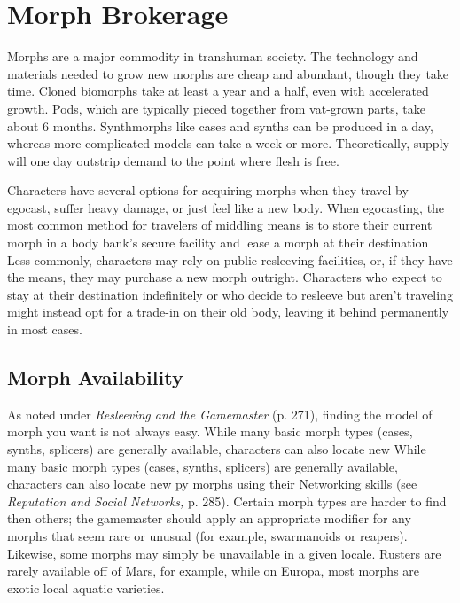 \section{Morph Brokerage}

Morphs are a major commodity in transhuman society. 
The technology and materials needed to grow new 
morphs are cheap and abundant, though they take 
time. Cloned biomorphs take at least a year and a half, 
even with accelerated growth. Pods, which are typically
pieced together from vat-grown parts, take about
6 months. Synthmorphs like cases and synths can be 
produced in a day, whereas more complicated models 
can take a week or more. Theoretically, supply will one 
day outstrip demand to the point where flesh is free.

Characters have several options for acquiring 
morphs when they travel by egocast, suffer heavy 
damage, or just feel like a new body. When egocasting, 
the most common method for travelers of middling 
means is to store their current morph in a body bank's 
secure facility and lease a morph at their destination
Less commonly, characters may rely on public
resleeving facilities, or, if they have the means, they 
may purchase a new morph outright. Characters who 
expect to stay at their destination indefinitely or who 
decide to resleeve but aren't traveling might instead 
opt for a trade-in on their old body, leaving it behind 
permanently in most cases.

\subsection{Morph Availability}

As noted under \textit{Resleeving and the Gamemaster} (p. 271), 
finding the model of morph you want is not always easy. 
While many basic morph types (cases, synths, splicers) 
are generally available, characters can also locate new 
While many basic morph types (cases, synths, splicers)
are generally available, characters can also locate new 
py
morphs using their Networking skills (see \textit{Reputation }
\textit{and Social Networks,} p. 285). Certain morph types 
are harder to find then others; the gamemaster should 
apply an appropriate modifier for any morphs that seem 
rare or unusual (for example, swarmanoids or reapers). 
Likewise, some morphs may simply be unavailable in a 
given locale. Rusters are rarely available off of Mars, for 
example, while on Europa, most morphs are exotic local 
aquatic varieties.

